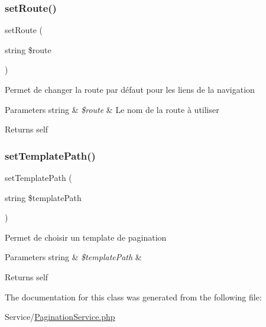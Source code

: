 \subsubsection{\texorpdfstring{setRoute()}{setRoute()}}
{\footnotesize\ttfamily set\+Route (\begin{DoxyParamCaption}\item[{string}]{\$route }\end{DoxyParamCaption})}

Permet de changer la route par défaut pour les liens de la navigation


\begin{DoxyParams}[1]{Parameters}
string & {\em \$route} & Le nom de la route à utiliser \\
\hline
\end{DoxyParams}
\begin{DoxyReturn}{Returns}
self 
\end{DoxyReturn}
\mbox{\label{class_app_1_1_service_1_1_pagination_service_a9604a19249a87f4ff96ae3dde0d909e0}} 
\subsubsection{\texorpdfstring{setTemplatePath()}{setTemplatePath()}}
{\footnotesize\ttfamily set\+Template\+Path (\begin{DoxyParamCaption}\item[{string}]{\$template\+Path }\end{DoxyParamCaption})}

Permet de choisir un template de pagination


\begin{DoxyParams}[1]{Parameters}
string & {\em \$template\+Path} & \\
\hline
\end{DoxyParams}
\begin{DoxyReturn}{Returns}
self 
\end{DoxyReturn}


The documentation for this class was generated from the following file\+:\begin{DoxyCompactItemize}
\item 
Service/\mbox{\hyperlink{_pagination_service_8php}{Pagination\+Service.\+php}}\end{DoxyCompactItemize}
